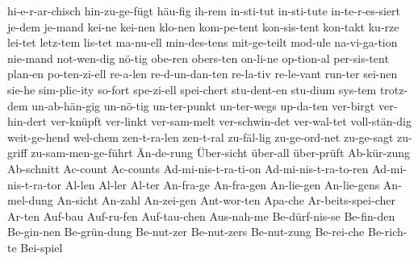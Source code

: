 {	hi-e-r-ar-chisch
	hin-zu-ge-fügt
	häu-fig
	ih-rem
	in-sti-tut
	in-sti-tute
	in-te-r-es-siert
	je-dem
	je-mand
	kei-ne
	kei-nen
	klo-nen
	kom-pe-tent
	kon-sis-tent
	kon-takt
	ku-rze
	lei-tet
	letz-tem
	lis-tet
	ma-nu-ell
	min-des-tens
	mit-ge-teilt
	mod-ule
	na-vi-ga-tion
	nie-mand
	not-wen-dig
	nö-tig
	obe-ren
	obers-ten
	on-li-ne
	op-tion-al
	per-sis-tent
	plan-en
	po-ten-zi-ell
	re-a-len
	re-d-un-dan-ten
	re-la-tiv
	re-le-vant
	run-ter
	sei-nen
	sie-he
	sim-plic-ity
	so-fort
	spe-zi-ell
	spei-chert
	stu-dent-en
	stu-dium
	sys-tem
	trotz-dem
	un-ab-hän-gig
	un-nö-tig
	un-ter-punkt
	un-ter-wegs
	up-da-ten
	ver-birgt
	ver-hin-dert
	ver-knüpft
	ver-linkt
	ver-sam-melt
	ver-schwin-det
	ver-wal-tet
	voll-stän-dig
	weit-ge-hend
	wel-chem
	zen-t-ra-len
	zen-t-ral
	zu-fäl-lig
	zu-ge-ord-net
	zu-ge-sagt
	zu-griff
	zu-sam-men-ge-führt
	Än-de-rung
	Über-sicht
	über-all
	über-prüft
        Ab-kür-zung
        Ab-schnitt
        Ac-count
        Ac-counts
        Ad-mi-nis-t-ra-ti-on
        Ad-mi-nis-t-ra-to-ren
        Ad-mi-nis-t-ra-tor
        Al-len
        Al-ler
        Al-ter
        An-fra-ge
        An-fra-gen
        An-lie-gen
        An-lie-gens
        An-mel-dung
        An-sicht
        An-zahl
        An-zei-gen
        Ant-wor-ten
        Apa-che
        Ar-beits-spei-cher
        Ar-ten
        Auf-bau
        Auf-ru-fen
        Auf-tau-chen
        Aus-nah-me
        Be-dürf-nis-se
        Be-fin-den
        Be-gin-nen
        Be-grün-dung
        Be-nut-zer
        Be-nut-zers
        Be-nut-zung
        Be-rei-che
        Be-rich-te
        Bei-spiel
}
